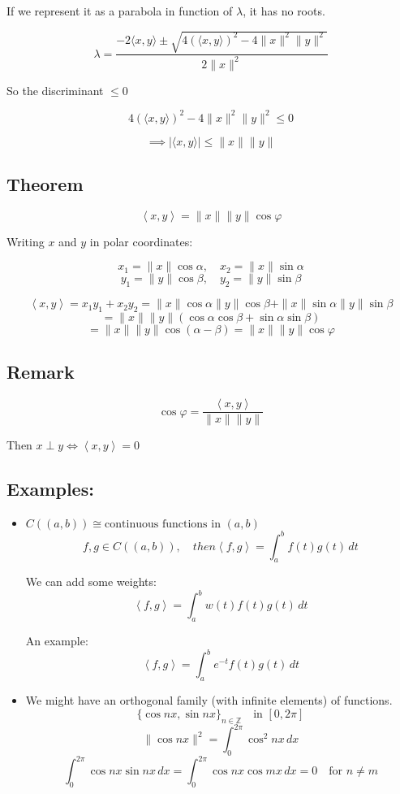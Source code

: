 \documentclass[11pt]{article}
\newcommand{\inner}[2]{\left\langle #1, #2 \right\rangle}
\begin{document}
If we represent it as a parabola in function of $\lambda$, it has no roots.

\[
\lambda = \frac{-2 \langle x, y \rangle \pm \sqrt{4 (\langle x, y \rangle)^2 - 4 \| x \|^2 \| y \|^2}}{2 \| x \|^2}
\]

So the discriminant $\leq 0$

\[
4 (\langle x, y \rangle)^2 - 4 \| x \|^2 \| y \|^2 \leq 0
\]

\[
\implies | \langle x, y \rangle | \leq \| x \| \| y \|
\]

\subsection{Theorem}
\[ 
\inner{x}{y} = \|x\| \|y\| \cos \varphi
\]

Writing $x$ and $y$ in polar coordinates:

\[ 
x_1 = \|x\| \cos \alpha, \quad x_2 = \|x\| \sin \alpha
\]
\[ 
y_1 = \|y\| \cos \beta, \quad y_2 = \|y\| \sin \beta
\]

\[
\inner{x}{y} = x_1 y_1 + x_2 y_2 = \|x\| \cos \alpha \|y\| \cos \beta + \|x\| \sin \alpha \|y\| \sin \beta
\]
\[ 
= \|x\|\|y\| (\cos \alpha \cos \beta + \sin \alpha \sin \beta)
\]
\[ 
= \|x\|\|y\| \cos(\alpha - \beta) = \|x\|\|y\| \cos \varphi
\]

\subsection*{Remark}
\[ 
\cos \varphi = \frac{\inner{x}{y}}{\|x\|\|y\|}
\]
\begin{center}
    Then $x \perp y \iff \inner{x}{y} = 0$
\end{center}

\subsection*{Examples:}
\begin{itemize}
    \item $C((a,b)) \cong \text{continuous functions in } (a,b)$
    \[
    f, g \in C((a,b)), \quad then \inner{f}{g} = \int_{a}^{b} f(t)g(t) \,dt 
    \]
    
    We can add some weights:
    \[
    \inner{f}{g} = \int_{a}^{b} w(t)f(t)g(t) \,dt 
    \]

    An example: 
    \[
    \inner{f}{g} = \int_{a}^{b} e^{-t}f(t)g(t) \,dt 
    \]
    \item We might have an orthogonal family (with infinite elements) of functions.
    \[
    \{\cos nx,\sin nx\}_{n \in \mathbb{Z}} \quad \text{in } [0,2\pi]
    \]
    \[\|\cos nx\|^2 = 
    \int_{0}^{2\pi} \cos^2 nx \,dx
    \]
    \[
    \int_{0}^{2\pi} \cos nx \sin nx \,dx = \int_{0}^{2\pi} \cos nx \cos mx \,dx = 0 \quad \text{for } n \neq m
    \]
\end{itemize}
\end{document}
